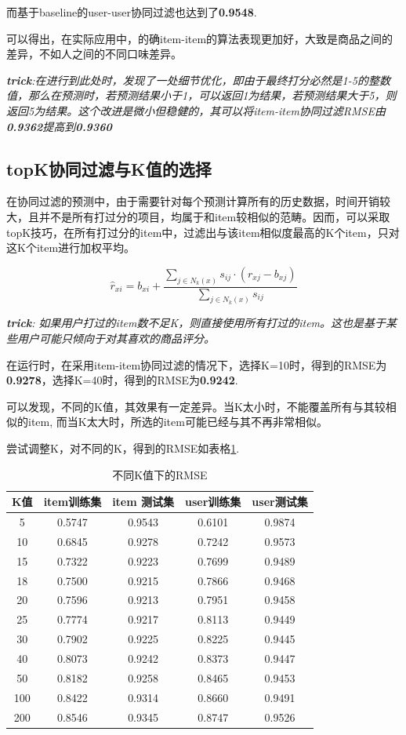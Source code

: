 \documentclass[utf8, a4paper, 11pt, onecolumn]{ctexart}
\begin{document}
\begin{spacing}{1.25}
而基于baseline的user-user协同过滤也达到了\textbf{0.9548}.

可以得出，在实际应用中，的确item-item的算法表现更加好，大致是商品之间的差异，不如人之间的不同口味差异。

\textit{\textbf{trick}:在进行到此处时，发现了一处细节优化，即由于最终打分必然是1-5的整数值，那么在预测时，若预测结果小于1，可以返回1为结果，若预测结果大于5，则返回5为结果。这个改进是微小但稳健的，其可以将item-item协同过滤RMSE由\textbf{0.9362}提高到\textbf{0.9360}}

\subsection{topK协同过滤与K值的选择}

在协同过滤的预测中，由于需要针对每个预测计算所有的历史数据，时间开销较大，且并不是所有打过分的项目，均属于和item较相似的范畴。因而，可以采取topK技巧，在所有打过分的item中，过滤出与该item相似度最高的K个item，只对这K个item进行加权平均。

\[\hat{r}_{xi} = b_{xi}  + \frac{\sum_{j \in N_k(x)} s_{ij} \cdot (r_{xj} - b_{xj})}{\sum_{j \in N_k(x)} s_{ij}} \]

\textit{\textbf{trick}: 如果用户打过的item数不足K，则直接使用所有打过的item。这也是基于某些用户可能只倾向于对其喜欢的商品评分。}

在运行时，在采用item-item协同过滤的情况下，选择K=10时，得到的RMSE为\textbf{0.9278}，选择K=40时，得到的RMSE为\textbf{0.9242}.

可以发现，不同的K值，其效果有一定差异。当K太小时，不能覆盖所有与其较相似的item, 而当K太大时，所选的item可能已经与其不再非常相似。

尝试调整K，对不同的K，得到的RMSE如表格\ref{k-table}.

\begin{table}[t]
	\centering
	\begin{tabular}{| c | c | c | c | c |}
		\hline
		\textbf{K值} & item训练集 & item 测试集&user训练集 & user测试集 \\ 
		\hline
		5 & 0.5747 	& 0.9543 & 0.6101 &	0.9874 \\ 
		\hline
		10 & 0.6845 &	0.9278 & 0.7242 &	0.9573 \\
		\hline
		15 & 0.7322 &	0.9223 & 0.7699 &	0.9489 \\
		\hline
		18 & 0.7500 &	0.9215 &	0.7866 &	0.9468 \\
		\hline
		20 & 0.7596 &	0.9213 & 0.7951 &	0.9458 \\
		\hline
		25 & 0.7774 &	0.9217 &	0.8113 &	0.9449 \\ 
		\hline
		30 & 0.7902 &	0.9225 &	0.8225 &	0.9445 \\
		\hline
		40 &0.8073 &	0.9242 &	0.8373 &	0.9447 \\
		\hline
		50 & 0.8182 &	0.9258 &	0.8465 &	0.9453 \\
		\hline
		100 & 0.8422 & 0.9314 &	0.8660 &	0.9491 \\
		\hline
		200 & 0.8546 &	0.9345 &	0.8747 &	0.9526 \\
		\hline 
	\end{tabular}
	\caption{不同K值下的RMSE}
	\label{k-table}
\end{table}


\end{spacing}
\end{document}
